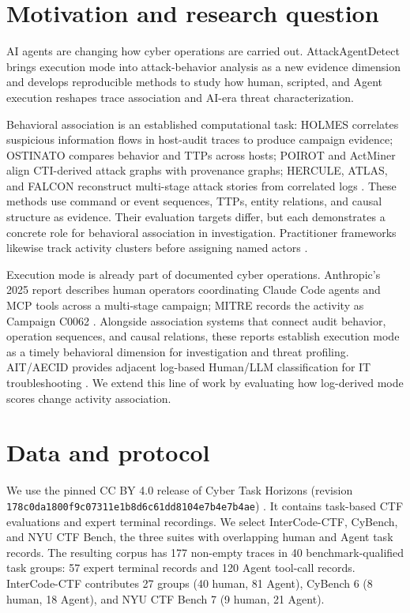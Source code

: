 \section{Motivation and research question}

AI agents are changing how cyber operations are carried out. AttackAgentDetect brings execution mode into attack-behavior analysis as a new evidence dimension and develops reproducible methods to study how human, scripted, and Agent execution reshapes trace association and AI-era threat characterization.

Behavioral association is an established computational task: HOLMES correlates suspicious information flows in host-audit traces to produce campaign evidence; OSTINATO compares behavior and TTPs across hosts; POIROT and ActMiner align CTI-derived attack graphs with provenance graphs; HERCULE, ATLAS, and FALCON reconstruct multi-stage attack stories from correlated logs \cite{holmes,ostinato,poirot,actminer,hercule,atlas,falcon}. These methods use command or event sequences, TTPs, entity relations, and causal structure as evidence. Their evaluation targets differ, but each demonstrates a concrete role for behavioral association in investigation. Practitioner frameworks likewise track activity clusters before assigning named actors \cite{unit42}.

Execution mode is already part of documented cyber operations. Anthropic's 2025 report describes human operators coordinating Claude Code agents and MCP tools across a multi-stage campaign; MITRE records the activity as Campaign C0062 \cite{anthropic,mitrec0062}. Alongside association systems that connect audit behavior, operation sequences, and causal relations, these reports establish execution mode as a timely behavioral dimension for investigation and threat profiling. AIT/AECID provides adjacent log-based Human/LLM classification for IT troubleshooting \cite{ait}. We extend this line of work by evaluating how log-derived mode scores change activity association.

\section{Data and protocol}

We use the pinned CC BY 4.0 release of Cyber Task Horizons (revision \texttt{178c0da1800f9\allowbreak c07311e1b8d\allowbreak 6c61dd8104e7b\allowbreak 4e7b4ae}) \cite{cth}. It contains task-based CTF evaluations and expert terminal recordings. We select InterCode-CTF, CyBench, and NYU CTF Bench, the three suites with overlapping human and Agent task records. The resulting corpus has 177 non-empty traces in 40 benchmark-qualified task groups: 57 expert terminal records and 120 Agent tool-call records. InterCode-CTF contributes 27 groups (40 human, 81 Agent), CyBench 6 (8 human, 18 Agent), and NYU CTF Bench 7 (9 human, 21 Agent).

